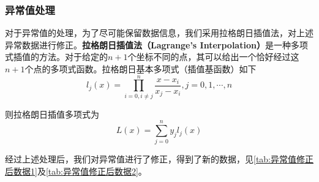 \documentclass{MathModeling}
\begin{document}
	\subsubsection{异常值处理}
对于异常值的处理，为了尽可能保留数据信息，我们采用拉格朗日插值法，对上述异常数据进行修正。\textbf{拉格朗日插值法（Lagrange's Interpolation）}是一种多项式插值的方法。对于给定的$n+1$个坐标不同的点，其可以给出一个恰好经过这$n+1$个点的多项式函数。拉格朗日基本多项式（插值基函数）如下
\begin{equation}
	l_{j}\left(x\right)=\prod_{i=0,i\neq j}^{n}\frac{x-x_{i}}{x_{j}-x_{i}},j=0,1,\cdots,n
\end{equation}

则拉格朗日插值多项式为
\begin{equation}
	L\left(x\right)=\sum_{j=0}^{n}y_{j}l_{j}\left(x\right)
\end{equation}

经过上述处理后，我们对异常值进行了修正，得到了新的数据，见\textcolor{blue}{\cref{tab:异常值修正后数据1}}及\textcolor{blue}{\cref{tab:异常值修正后数据2}}。
\begin{table}[H]
	\centering
	\caption{人数异常值修正}
	\label{tab:异常值修正后数据1}
\end{table}
\begin{table}[H]
	\centering
	\caption{百分比异常值修正}
	\label{tab:异常值修正后数据2}
\end{table}
\end{document}
